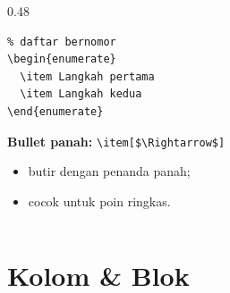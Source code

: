 \begin{frame}[fragile]
\begin{columns}[T]
\begin{column}{0.48\textwidth}
\begin{lstlisting}
% daftar bernomor
\begin{enumerate}
  \item Langkah pertama
  \item Langkah kedua
\end{enumerate}
      \end{lstlisting}

      {\small\textbf{Bullet panah:} \texttt{\textbackslash item[\$\textbackslash Rightarrow\$]}}
      \begin{itemize}
        \item[$\Rightarrow$] butir dengan penanda panah;
        \item[$\Rightarrow$] cocok untuk poin ringkas.
      \end{itemize}
    \end{column}
  \end{columns}
\end{frame}

\section{Kolom \& Blok}

